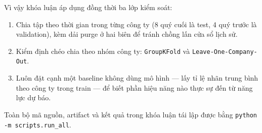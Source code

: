 Vì vậy khóa luận áp dụng đồng thời ba lớp kiểm soát:

\begin{enumerate}
\item Chia tập theo thời gian trong từng công ty (8 quý cuối là test, 4 quý trước là validation),
      kèm dải purge ở hai biên để tránh chồng lấn cửa sổ lịch sử.
\item Kiểm định chéo chia theo nhóm công ty: \texttt{GroupKFold} và \texttt{Leave-One-Company-Out}.
\item Luôn đặt cạnh một baseline không dùng mô hình — lấy tỉ lệ nhãn trung bình theo công ty trong
      train — để biết phần hiệu năng nào thực sự đến từ năng lực dự báo.
\end{enumerate}

Toàn bộ mã nguồn, artifact và kết quả trong khóa luận tái lập được bằng
\texttt{python -m scripts.run\_all}.
